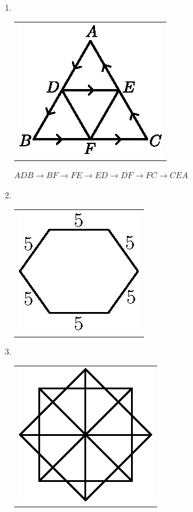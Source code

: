 \begin{enumerate}
\item 
~

  \vskip -0.5cm
  
\begin{tabular}[t]{c}
\centering
\includegraphics{src/figures/ans34.eps}
\end{tabular}
$ADB \to BF \to FE \to ED \to DF \to FC \to CEA$

\bigskip

\item 
~

  \vskip -0.5cm
  
\begin{tabular}[t]{c}
\centering
\includegraphics{src/figures/ans35.eps}
\end{tabular}

\bigskip

\item 
~

  \vskip -0.5cm
  
\begin{tabular}[t]{c}
\centering
\includegraphics{src/figures/ans36.eps}
\end{tabular}


\end{enumerate}
